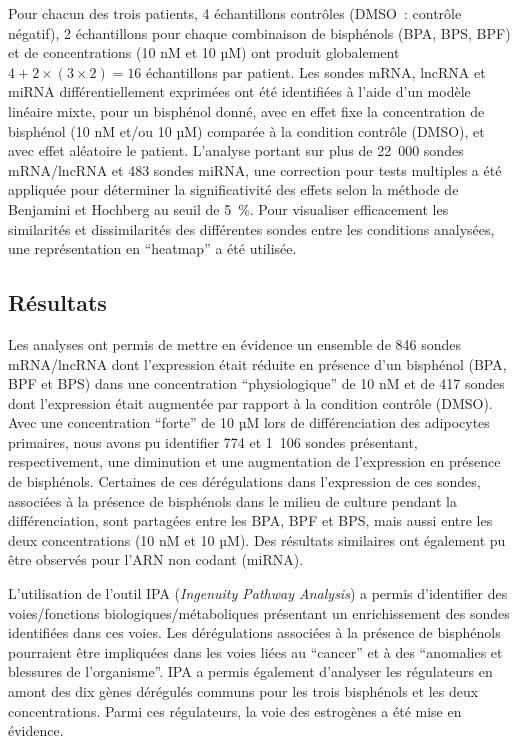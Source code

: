 \documentclass[11pt,a4paper,notrimn]{krantz}
\theoremstyle{definition}
\theoremstyle{definition}
\theoremstyle{remark}
\begin{document}
Pour chacun des trois patients, 4 échantillons contrôles (DMSO~:
contrôle négatif), 2 échantillons pour chaque combinaison de bisphénols
(BPA, BPS, BPF) et de concentrations (10 nM et 10 µM) ont produit
globalement \(4 + 2\times(3\times2) = 16\) échantillons par patient. Les
sondes mRNA, lncRNA et miRNA différentiellement exprimées ont été
identifiées à l'aide d'un modèle linéaire mixte, pour un bisphénol
donné, avec en effet fixe la concentration de bisphénol (10 nM et/ou 10
µM) comparée à la condition contrôle (DMSO), et avec effet aléatoire le
patient. L'analyse portant sur plus de 22~000 sondes mRNA/lncRNA et 483
sondes miRNA, une correction pour tests multiples a été appliquée pour
déterminer la significativité des effets selon la méthode de Benjamini
et Hochberg au seuil de 5~\%. Pour visualiser efficacement les
similarités et dissimilarités des différentes sondes entre les
conditions analysées, une représentation en ``heatmap'' a été utilisée.

\subsection{Résultats}\label{resultats-3}

Les analyses ont permis de mettre en évidence un ensemble de 846 sondes
mRNA/lncRNA dont l'expression était réduite en présence d'un bisphénol
(BPA, BPF et BPS) dans une concentration ``physiologique'' de 10 nM et
de 417 sondes dont l'expression était augmentée par rapport à la
condition contrôle (DMSO). Avec une concentration ``forte'' de 10 µM
lors de différenciation des adipocytes primaires, nous avons pu
identifier 774 et 1~106 sondes présentant, respectivement, une
diminution et une augmentation de l'expression en présence de
bisphénols. Certaines de ces dérégulations dans l'expression de ces
sondes, associées à la présence de bisphénols dans le milieu de culture
pendant la différenciation, sont partagées entre les BPA, BPF et BPS,
mais aussi entre les deux concentrations (10 nM et 10 µM). Des résultats
similaires ont également pu être observés pour l'ARN non codant (miRNA).

L'utilisation de l'outil IPA (\emph{Ingenuity Pathway Analysis}) a
permis d'identifier des voies/fonctions biologiques/métaboliques
présentant un enrichissement des sondes identifiées dans ces voies. Les
dérégulations associées à la présence de bisphénols pourraient être
impliquées dans les voies liées au ``cancer'' et à des ``anomalies et
blessures de l'organisme''. IPA a permis également d'analyser les
régulateurs en amont des dix gènes dérégulés communs pour les trois
bisphénols et les deux concentrations. Parmi ces régulateurs, la voie
des estrogènes a été mise en évidence.
\end{document}
